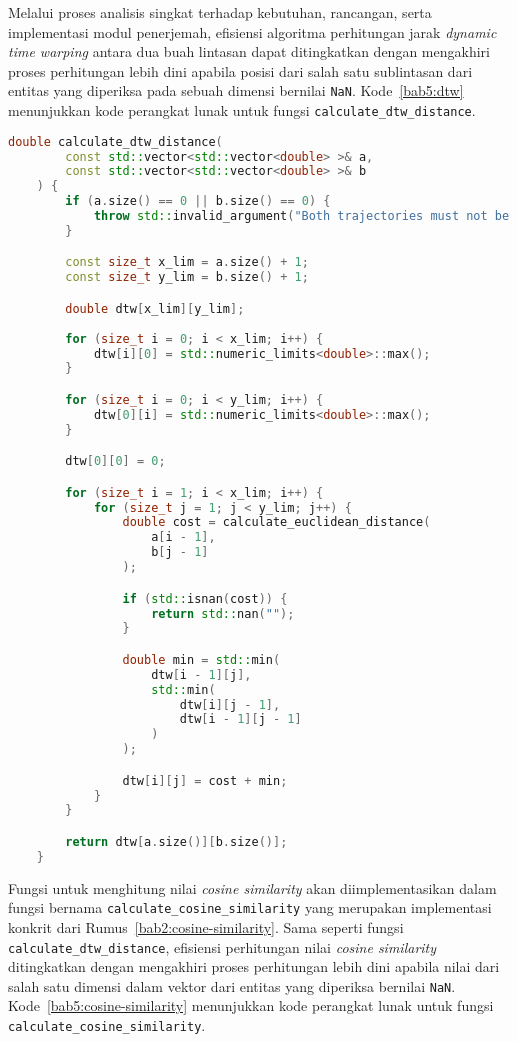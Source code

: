 Melalui proses analisis singkat terhadap kebutuhan, rancangan, serta implementasi modul penerjemah, efisiensi algoritma perhitungan jarak \textit{dynamic time warping} antara dua buah lintasan dapat ditingkatkan dengan mengakhiri proses perhitungan lebih dini apabila posisi dari salah satu sublintasan dari entitas yang diperiksa pada sebuah dimensi bernilai \texttt{NaN}. Kode~\ref{bab5:dtw} menunjukkan kode perangkat lunak untuk fungsi \texttt{calculate\_dtw\_distance}.

\clearpage


\begin{lstlisting}[language=C++, caption=Implementasi fungsi \texttt{calculate\_dtw\_distance}, label={bab5:dtw}]
    double calculate_dtw_distance(
        const std::vector<std::vector<double> >& a,
        const std::vector<std::vector<double> >& b
    ) {
        if (a.size() == 0 || b.size() == 0) {
            throw std::invalid_argument("Both trajectories must not be empty.");
        }

        const size_t x_lim = a.size() + 1;
        const size_t y_lim = b.size() + 1;

        double dtw[x_lim][y_lim];
        
        for (size_t i = 0; i < x_lim; i++) {
            dtw[i][0] = std::numeric_limits<double>::max();
        }

        for (size_t i = 0; i < y_lim; i++) {
            dtw[0][i] = std::numeric_limits<double>::max();
        }

        dtw[0][0] = 0;

        for (size_t i = 1; i < x_lim; i++) {
            for (size_t j = 1; j < y_lim; j++) {
                double cost = calculate_euclidean_distance(
                    a[i - 1],
                    b[j - 1]
                );

                if (std::isnan(cost)) {
                    return std::nan("");
                }

                double min = std::min(
                    dtw[i - 1][j],
                    std::min(
                        dtw[i][j - 1],
                        dtw[i - 1][j - 1]
                    )
                );

                dtw[i][j] = cost + min;
            }
        }

        return dtw[a.size()][b.size()];
    }
\end{lstlisting}

Fungsi untuk menghitung nilai \textit{cosine similarity} akan diimplementasikan dalam fungsi bernama \texttt{calculate\_cosine\_similarity} yang merupakan implementasi konkrit dari Rumus~\ref{bab2:cosine-similarity}. Sama seperti fungsi \texttt{calculate\_dtw\_distance}, efisiensi perhitungan nilai \textit{cosine similarity} ditingkatkan dengan mengakhiri proses perhitungan lebih dini apabila nilai dari salah satu dimensi dalam vektor dari entitas yang diperiksa bernilai \texttt{NaN}. Kode~\ref{bab5:cosine-similarity} menunjukkan kode perangkat lunak untuk fungsi \texttt{calculate\_cosine\_similarity}.

